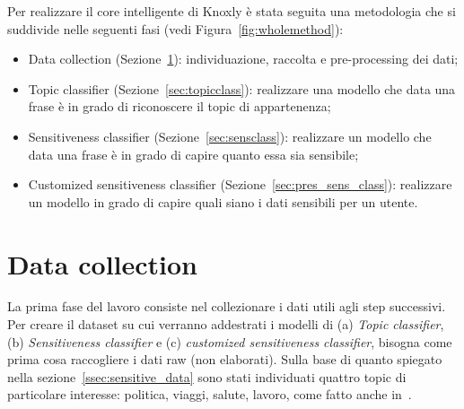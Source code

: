 Per realizzare il core intelligente di Knoxly è stata seguita una metodologia che si suddivide nelle seguenti fasi (vedi Figura~\ref{fig:wholemethod}):
\begin{itemize}
    \item Data collection (Sezione~\ref{datacollection}): individuazione, raccolta e pre-processing dei dati;
    \item Topic classifier (Sezione~\ref{sec:topicclass}): realizzare una modello che data una frase è in grado di riconoscere il topic di appartenenza;
    \item Sensitiveness classifier (Sezione~\ref{sec:sensclass}): realizzare un modello che data una frase è in grado di capire quanto essa sia sensibile;
    \item Customized sensitiveness classifier (Sezione~\ref{sec:pres_sens_class}): realizzare un modello in grado di capire quali siano i dati sensibili per un utente.
\end{itemize}



\section{Data collection}
\label{datacollection}
La prima fase del lavoro consiste nel collezionare i dati utili agli step successivi. Per creare il dataset su cui verranno addestrati i modelli di (a) \textit{Topic classifier}, (b) \textit{Sensitiveness classifier} e (c) \textit{customized sensitiveness classifier}, bisogna come prima cosa raccogliere i dati raw (non elaborati).
Sulla base di quanto spiegato nella sezione~\ref{ssec:sensitive_data} sono stati individuati quattro topic di particolare interesse: politica, viaggi, salute, lavoro, come fatto anche in~\cite{looseTweets,dontTweetThis,MalandrinoScarano}.

\begin{table}[h]

\centering
    \fontsize{4.6mm}{4.6mm}
\caption{Dataset scelti su Kaggle.com per ogni topic d'interesse.}
\label{tab:ds_scelti}
\end{table}
\FloatBarrier

